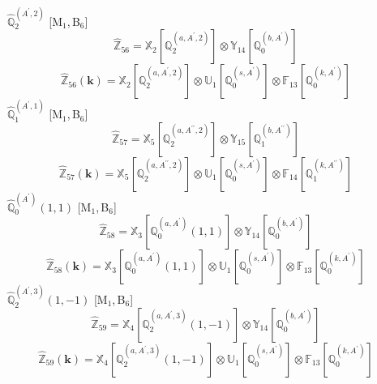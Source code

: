 \documentclass[fleqn,10pt,landscape]{article}
\begin{document}
\begin{itemize}
\begin{dmath*}
\end{dmath*}
\vspace{4mm}
\noindent {} $\,\,\,\hat{\mathbb{Q}}_{2}^{(A^{\prime},2)}$ [M$_{1}$,\,B$_{6}$]
\begin{dmath*}
\hat{\mathbb{Z}}_{56}=\mathbb{X}_{2}[\mathbb{Q}_{2}^{(a,A^{\prime},2)}] \otimes\mathbb{Y}_{14}[\mathbb{Q}_{0}^{(b,A^{\prime})}]
\end{dmath*}
\begin{dmath*}
\hat{\mathbb{Z}}_{56}(\bm{k})=\mathbb{X}_{2}[\mathbb{Q}_{2}^{(a,A^{\prime},2)}] \otimes\mathbb{U}_{1}[\mathbb{Q}_{0}^{(s,A^{\prime})}] \otimes\mathbb{F}_{13}[\mathbb{Q}_{0}^{(k,A^{\prime})}]
\end{dmath*}
\vspace{4mm}
\noindent {} $\,\,\,\hat{\mathbb{Q}}_{1}^{(A^{\prime},1)}$ [M$_{1}$,\,B$_{6}$]
\begin{dmath*}
\hat{\mathbb{Z}}_{57}=\mathbb{X}_{5}[\mathbb{Q}_{2}^{(a,A^{\prime\prime},2)}] \otimes\mathbb{Y}_{15}[\mathbb{Q}_{1}^{(b,A^{\prime\prime})}]
\end{dmath*}
\begin{dmath*}
\hat{\mathbb{Z}}_{57}(\bm{k})=\mathbb{X}_{5}[\mathbb{Q}_{2}^{(a,A^{\prime\prime},2)}] \otimes\mathbb{U}_{1}[\mathbb{Q}_{0}^{(s,A^{\prime})}] \otimes\mathbb{F}_{14}[\mathbb{Q}_{1}^{(k,A^{\prime\prime})}]
\end{dmath*}
\vspace{4mm}
\noindent {} $\,\,\,\hat{\mathbb{Q}}_{0}^{(A^{\prime})}(1,1)$ [M$_{1}$,\,B$_{6}$]
\begin{dmath*}
\hat{\mathbb{Z}}_{58}=\mathbb{X}_{3}[\mathbb{Q}_{0}^{(a,A^{\prime})}(1,1)] \otimes\mathbb{Y}_{14}[\mathbb{Q}_{0}^{(b,A^{\prime})}]
\end{dmath*}
\begin{dmath*}
\hat{\mathbb{Z}}_{58}(\bm{k})=\mathbb{X}_{3}[\mathbb{Q}_{0}^{(a,A^{\prime})}(1,1)] \otimes\mathbb{U}_{1}[\mathbb{Q}_{0}^{(s,A^{\prime})}] \otimes\mathbb{F}_{13}[\mathbb{Q}_{0}^{(k,A^{\prime})}]
\end{dmath*}
\vspace{4mm}
\noindent {} $\,\,\,\hat{\mathbb{Q}}_{2}^{(A^{\prime},3)}(1,-1)$ [M$_{1}$,\,B$_{6}$]
\begin{dmath*}
\hat{\mathbb{Z}}_{59}=\mathbb{X}_{4}[\mathbb{Q}_{2}^{(a,A^{\prime},3)}(1,-1)] \otimes\mathbb{Y}_{14}[\mathbb{Q}_{0}^{(b,A^{\prime})}]
\end{dmath*}
\begin{dmath*}
\hat{\mathbb{Z}}_{59}(\bm{k})=\mathbb{X}_{4}[\mathbb{Q}_{2}^{(a,A^{\prime},3)}(1,-1)] \otimes\mathbb{U}_{1}[\mathbb{Q}_{0}^{(s,A^{\prime})}] \otimes\mathbb{F}_{13}[\mathbb{Q}_{0}^{(k,A^{\prime})}]

\end{dmath*}
\end{itemize}
\end{document}
